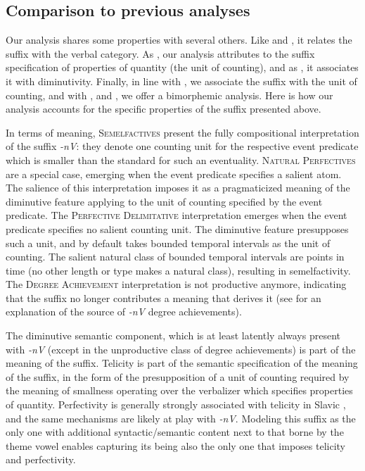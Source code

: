 \documentclass[output=paper,colorlinks,citecolor=brown]{langscibook}
\begin{document}
\subsection{Comparison to previous analyses} \label{str:subsect:Advantages_of_our_analysis}

Our analysis shares some properties with several others. Like \citet{sta+:Svenonius2004} and \citet{sta+:Biskup2023, Biskup2023Matryoshka,sta+:Biskup2020}, it relates the suffix with the verbal category. As \citet{Kwapiszewski2020}, our analysis attributes to the suffix specification of properties of quantity (the unit of counting), and as \citet{Arsenijevic2006}, it associates it with diminutivity. Finally, in line with \citet{Armoskaite2008}, we associate the suffix with the unit of counting, and with \citet{sta+:Lazorczyk2010,TaraldsenMedovaWiland2019}, and \citet{Wiland2019}, we offer a bimorphemic analysis. Here is how our analysis accounts for the specific properties of the suffix presented above.

In terms of meaning, \textsc{Semelfactives} present the fully compositional interpretation of the suffix \textit{-nV}: they denote one counting unit for the respective event predicate which is smaller than the standard for such an eventuality. \textsc{Natural Perfectives} are a special case, emerging when the event predicate specifies a salient atom. The salience of this interpretation imposes it as a pragmaticized meaning of the diminutive feature applying to the unit of counting specified by the event predicate. The \textsc{Perfective Delimitative} interpretation emerges when the event predicate specifies no salient counting unit. The diminutive feature presupposes such a unit, and by default takes bounded temporal intervals as the unit of counting. The salient natural class of bounded temporal intervals are points in time (no other length or type makes a natural class), resulting in semelfactivity. The \textsc{Degree Achievement} interpretation is not productive anymore, indicating that the suffix no longer contributes a meaning that derives it (see \citealt{Rothstein2008Puzzles} for an explanation of the source of \textit{-nV} degree achievements).
	
The diminutive semantic component, which is at least latently always present with \textit{-nV} (except in the unproductive class of degree achievements) is part of the meaning of the suffix. Telicity is part of the semantic specification of the meaning of the suffix, in the form of the presupposition of a unit of counting required by the meaning of smallness operating over the verbalizer which specifies properties of quantity. Perfectivity is generally strongly associated with telicity in Slavic \citep{Borer2005Structuring,Arsenijevic2006, Arsenijevic2023,sta+:Lazorczyk2010,sta+:Milosavljevic2022, Milosavljevic2023Advances, Milosavljevic2023PhD}, and the same mechanisms are likely at play with \textit{-nV}. Modeling this suffix as the only one with additional syntactic/semantic content next to that borne by the theme vowel \citep{SimonovicEtAl2021,ArsenijevicEtAl2023} enables capturing its being also the only one that imposes telicity and perfectivity.
\end{document}
